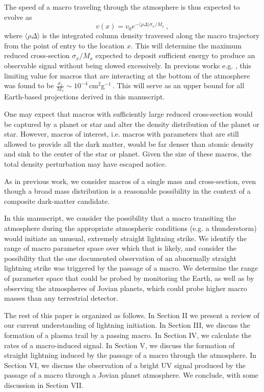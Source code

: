 \documentclass[%
 reprint,
 amsmath,amssymb,
 aps,
 nofootinbib, %
]{revtex4-2}
\begin{document}
    The speed of a macro traveling through the atmosphere is thus expected to evolve as
    \begin{equation}\label{eq:atmo_velocity}
        v(x) = v_{0} e^{-\langle \rho \Delta\rangle \sigma_x/{M_x}}\,,
    \end{equation}
    where $\langle \rho \Delta\rangle$ is the integrated column density traversed along the macro trajectory from the point of entry to the location $x$. This will determine the maximum reduced cross-section $\sigma_x/M_x$ expected to deposit sufficient energy to produce an observable signal without being slowed excessively. In previous works e.g. \citet{Sidhu2019death, Sidhu2019bolide}, this limiting value for macros that are interacting at the bottom of the atmosphere was found to be $\frac{\sigma_x}{M_x} \sim 10^{-4}\,$cm$^2$g$^{-1}\,$. This will serve as an upper bound for all Earth-based projections derived in this manuscript.

    One may expect that macros with sufficiently large reduced cross-section would be captured by a planet or star and alter the density distribution of the planet or star. However, macros of interest, i.e. macros with parameters that are still allowed to provide all the dark matter, would be far denser than atomic density and sink to the center of the star or planet. Given the size of these macros, the total density perturbation may have escaped notice.

    As in previous work, we consider macros of a single mass and cross-section, even though a broad mass distribution is a reasonable possibility in the context of a composite dark-matter candidate.

    In this manuscript, we consider the possibility that a macro transiting the atmosphere during the appropriate atmospheric conditions (e.g. a thunderstorm) would initiate an unusual, extremely straight lightning strike. We identify the range of macro parameter space over which that is likely, and consider the possibility that the one documented observation of an abnormally straight lightning strike was triggered by the passage of a macro.  We determine the range of parameter space that could be probed by monitoring the Earth, as well as by observing the atmospheres of Jovian planets, which could probe higher macro masses than any terrestrial detector. 

    The rest of this paper is organized as follows. In Section II we present a review of our current understanding of lightning initiation. In Section III, we discuss the formation of a plasma trail by a passing macro. In Section IV, we calculate the rates of a macro-induced signal. In Section V, we discuss the formation of straight lightning induced by the passage of a macro through the atmosphere. In Section VI, we discuss the observation of a bright UV signal produced by the passage of a macro through a Jovian planet atmosphere. We conclude, with some discussion in Section VII.
\end{document}
